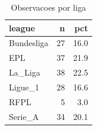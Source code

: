 \begin{table}

\caption{\label{tab:n_liga_g20}Observacoes por liga}
\centering
\begin{tabular}[t]{lrr}
\toprule
league & n & pct\\
\midrule
Bundesliga & 27 & 16.0\\
EPL & 37 & 21.9\\
La\_Liga & 38 & 22.5\\
Ligue\_1 & 28 & 16.6\\
RFPL & 5 & 3.0\\
\addlinespace
Serie\_A & 34 & 20.1\\
\bottomrule
\end{tabular}
\end{table}
